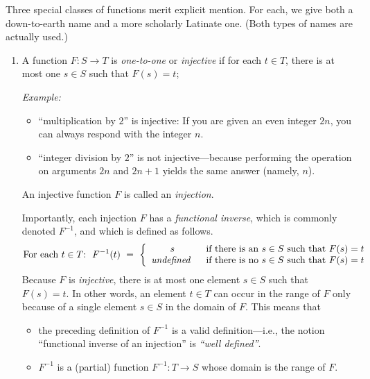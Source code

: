 \bigskip

Three special classes of functions merit explicit mention.  For each, we give both a down-to-earth name and a more scholarly Latinate one.  (Both types of names are actually used.)
\begin{enumerate}
\item
A function $F: S \rightarrow T$ is {\it one-to-one} or {\it injective} if for each $t \in T$, there is at most one $s \in S$ such that $F(s) = t$;

\medskip

{\em Example:}
\begin{itemize}
\item
 ``multiplication by $2$'' is injective: If you are given an even integer $2n$, you can always respond with the integer $n$.
\medskip\item
``integer division by $2$'' is not injective---because performing the operation on arguments $2n$ and $2n+1$ yields the same answer (namely, $n$).
\end{itemize}

An injective function $F$ is called an {\it injection}.

\smallskip

 

Importantly, each injection $F$ has a {\it functional inverse}, which is commonly denoted $F^{-1}$, and which is defined as follows.
\[
\mbox{For each $t \in T$:} \ \
F^{-1}(t) \ = \ \left\{
\begin{array}{cl}
s &
\mbox{ if there is an $s \in S$ such that $F(s) = t$} \\
\mbox{\it undefined } &
\mbox{ if there is no $s \in S$ such that $F(s) = t$}
\end{array}
\right.
\]
Because $F$ is {\em injective}, there is at most one element $s \in S$ such that $F(s)= t$.  In other words, an element $t \in T$ can occur in the range of $F$ only because of a single element $s \in S$ in the domain of $F$.  This means that
\begin{itemize}
\item
the preceding definition of $F^{-1}$ is a valid definition---i.e., the notion ``functional inverse of an injection'' is {\it ``well defined''}.
\medskip\item
$F^{-1}$ is a (partial) function $F^{-1}: T \rightarrow S$ whose domain is the range of $F$.
\end{itemize}


\end{enumerate}
